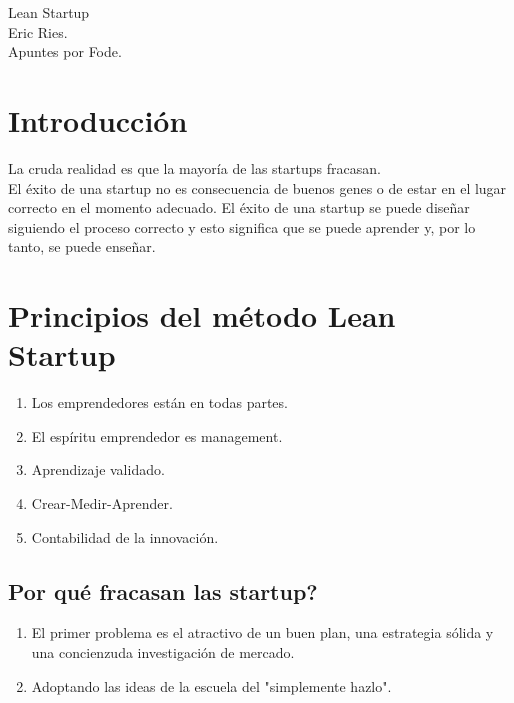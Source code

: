 \documentclass[10pt]{article}
\begin{document}
\begin{center}
\huge Lean Startup\\
\vspace*{0.5cm}
\large Eric Ries.\\
\vspace{1cm}
\Large Apuntes por Fode.
\vspace{1.5cm}
\end{center}

\section*{Introducción}
La cruda realidad es que la mayoría de las startups fracasan.\\
El éxito de una startup no es consecuencia de buenos genes o de estar en el lugar correcto en el momento adecuado. El éxito de una startup se puede diseñar siguiendo el proceso correcto y esto significa que se puede aprender y, por lo tanto, se puede enseñar.

\section*{Principios del método Lean Startup}
\begin{enumerate}
\item Los emprendedores están en todas partes.
\item El espíritu emprendedor es management.
\item Aprendizaje validado.
\item Crear-Medir-Aprender.
\item Contabilidad de la innovación.
\end{enumerate}
\subsection*{Por qué fracasan las startup?}
\begin{enumerate}
\item El primer problema es el atractivo de un buen plan, una estrategia sólida y una concienzuda investigación de mercado.
\item Adoptando las ideas de la escuela del "simplemente hazlo".
\end{enumerate}
\end{document}
